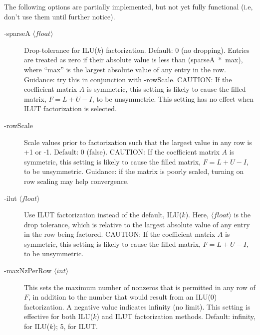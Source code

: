 The following options are partially implemented, but not
yet fully functional (i.e, don't use them until further notice).

\begin{description}
\item[-sparseA $\langle float \rangle$] Drop-tolerance for ILU($k$) factorization.
                        Default: 0 (no dropping).
                        Entries are treated as zero if their absolute
                        value is less than \mbox{(sparseA * max)}, where ``max''
                        is the largest absolute value of any entry in the
                        row. Guidance: try this in conjunction with 
                        -rowScale.  CAUTION: If the coefficient matrix $A$ is 
                        symmetric, this
                        setting is likely to cause the filled matrix,
                        $F = L+U-I$, to be unsymmetric.
                        This setting has no effect when ILUT factorization
                        is selected.
\item[-rowScale] Scale values prior to factorization such that the
                 largest value in any row is +1 or -1.
                 Default: 0 (false).
                 CAUTION: If the coefficient matrix $A$ is symmetric, this 
                 setting is likely to cause the filled matrix,
                 $F = L+U-I$, to be unsymmetric.
                 Guidance: if the matrix is poorly scaled, turning on
                 row scaling may help convergence.
\item[-ilut $\langle float \rangle$] Use ILUT factorization instead
                 of the default, ILU($k$).  Here, $\langle float \rangle$
                 is the drop tolerance, which is relative to the largest 
                 absolute value of any entry in the row being factored.
                 CAUTION: If the coefficient matrix $A$ is symmetric, this 
                 setting is likely to cause the filled matrix,
                 $F = L+U-I$, to be unsymmetric.
\item[-maxNzPerRow  $\langle int \rangle$] This sets the maximum number
                 of nonzeros that is permitted in any row of $F$, in
                 addition to the number that would result from an ILU(0)
                 factorization.  A negative value %
                 indicates infinity (no limit).
                 This setting is effective for both ILU($k$)
                 and ILUT factorization methods.
                 Default: infinity, for ILU($k$); 5, for ILUT.
\end{description}

